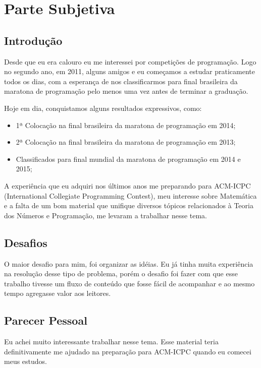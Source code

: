 \documentclass[
11pt, %
brazilian, %
singlespacing, %
]{MastersDoctoralThesis} %
\begin{document}
\newpage

\chapter*{Parte Subjetiva}
\thispagestyle{empty}

\section {Introdução}

Desde que eu era calouro eu me interessei por competições de programação. Logo no segundo ano, em 2011, alguns amigos e eu começamos a estudar praticamente todos os dias, com a esperança de nos classificarmos para final brasileira da maratona de programação pelo menos uma vez antes de terminar a graduação.

Hoje em dia, conquistamos alguns resultados expressivos, como:

\begin{itemize}
\item 1ª Colocação na final brasileira da maratona de programação em 2014;
\item 2ª Colocação na final brasileira da maratona de programação em 2013;
\item Classificados para final mundial da maratona de programação em 2014 e 2015;
\end{itemize}

A experiência que eu adquiri nos últimos anos me preparando para ACM-ICPC (International Collegiate Programming Contest), meu interesse sobre Matemática e a falta de um bom material que unifique diversos tópicos relacionados à Teoria dos Números e Programação, me levaram a trabalhar nesse tema.



\section {Desafios}
O maior desafio para mim, foi organizar as idéias.
Eu já tinha muita experiência na resolução desse tipo de problema, porém o desafio foi fazer com que esse trabalho tivesse um fluxo de conteúdo que fosse fácil de acompanhar e ao mesmo tempo agregasse valor aos leitores.



\section {Parecer Pessoal}
Eu achei muito interessante trabalhar nesse tema. Esse material teria definitivamente me ajudado na preparação para ACM-ICPC quando eu comecei meus estudos.
\end{document}
